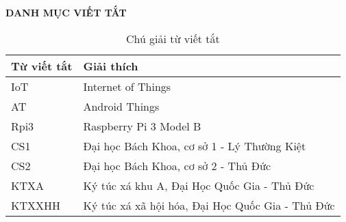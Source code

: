 \begin{center}
\bf{DANH MỤC VIẾT TẮT}
\end{center}

\begin{table}[!h]
\begin{center}

\begin{tabular}{|l|l|}
\hline
\textbf{Từ viết tắt} & \textbf{Giải thích} \\ 
\hline
IoT & Internet of Things\\
\hline
AT & Android Things\\
\hline
Rpi3 & Raspberry Pi 3 Model B\\
\hline
CS1 & Đại học Bách Khoa, cơ sở 1 - Lý Thường Kiệt\\
\hline
CS2 & Đại học Bách Khoa, cơ sở 2 - Thủ Đức\\
\hline
KTXA & Ký túc xá khu A, Đại Học Quốc Gia - Thủ Đức\\
\hline
KTXXHH & Ký túc xá xã hội hóa, Đại Học Quốc Gia - Thủ Đức\\
\hline
\end{tabular}
\caption{Chú giải từ viết tắt}
\end{center}
\end{table}


\setlength{\parindent}{0pt}
